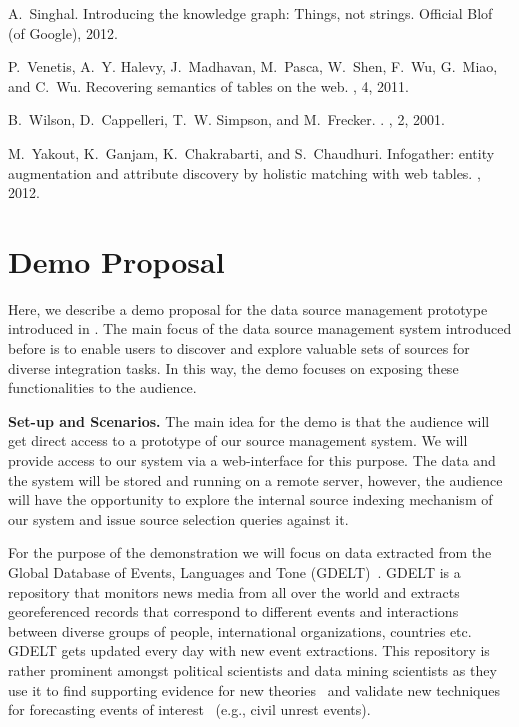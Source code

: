 \documentclass{sig-alternate}
\begin{document}
\begin{thebibliography}{10}
A.~Singhal.
\newblock Introducing the knowledge graph: Things, not strings.
\newblock Official Blof (of Google), 2012.

P.~Venetis, A.~Y. Halevy, J.~Madhavan, M.~Pasca, W.~Shen, F.~Wu, G.~Miao, and
  C.~Wu.
\newblock Recovering semantics of tables on the web.
, 4, 2011.

B.~Wilson, D.~Cappelleri, T.~W. Simpson, and M.~Frecker.
.
, 2, 2001.

M.~Yakout, K.~Ganjam, K.~Chakrabarti, and S.~Chaudhuri.
\newblock Infogather: entity augmentation and attribute discovery by holistic
  matching with web tables.
, 2012.

\end{thebibliography}

\appendix
\section{Demo Proposal}
Here, we describe a demo proposal for the data source management prototype introduced in . The main focus of the data source management system introduced before is to enable users to discover and explore valuable sets of sources for diverse integration tasks. In this way, the demo focuses on exposing these functionalities to the audience. 

\vspace{3pt}\noindent\textbf{Set-up and Scenarios.} The main idea for the demo is that the audience will get direct access to a prototype of our source management system. We will provide access to our system via a web-interface for this purpose. The data and the system will be stored and running on a remote server, however, the audience will have the opportunity to explore the internal source indexing mechanism of our system and issue source selection queries against it. 

For the purpose of the demonstration we will focus on data extracted from the Global Database of Events, Languages and Tone (GDELT)~\cite{leetaru_ap:2013}. GDELT is a repository that monitors news media from all over the world and extracts georeferenced records that correspond to different events and interactions between diverse groups of people, international organizations, countries etc. GDELT gets updated every day with new event extractions. This repository is rather prominent amongst political scientists and data mining scientists as they use it to find supporting evidence for new theories~\cite{schutte_ap:2014} and validate new techniques for forecasting events of interest~\cite{keneshloo_ap:2014} (e.g., civil unrest events). 
\end{document}

